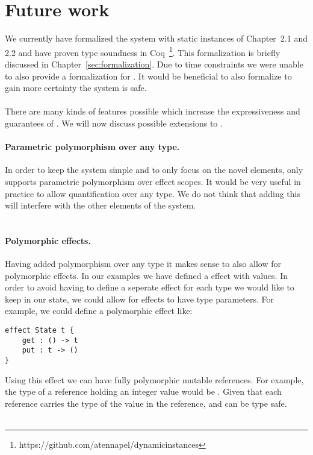 \section{Future work}
We currently have formalized the system with static instances of Chapter~2.1 and 2.2 and have proven type soundness in Coq~\footnote{https://github.com/atennapel/dynamicinstances}.
This formalization is briefly discussed in Chapter~\ref{sec:formalization}.
Due to time constraints we were unable to also provide a formalization for \lang{}.
It would be beneficial to also formalize \lang{} to gain more certainty the system is safe.
\\\\
There are many kinds of features possible which increase the expressiveness and guarantees of \lang{}.
We will now discuss possible extensions to \lang{}.

\paragraph{Parametric polymorphism over any type.}
In order to keep the system simple and to only focus on the novel elements, \lang{} only supports parametric polymorphism over effect scopes.
It would be very useful in practice to allow quantification over any type.
We do not think that adding this will interfere with the other elements of the system.
\\\\
\paragraph{Polymorphic effects.}
Having added polymorphism over any type it makes sense to also allow for polymorphic effects.
In our examples we have defined a  effect with  values.
In order to avoid having to define a seperate effect for each type we would like to keep in our state, we could allow for effects to have type parameters.
For example, we could define a polymorphic  effect like:
\begin{verbatim}
effect State t {
	get : () -> t
	put : t -> ()
}
\end{verbatim}

Using this effect we can have fully polymorphic mutable references.
For example, the type of a reference holding an integer value would be .
Given that each reference carries the type of the value in the reference,  and  can be type safe.
\\\\
